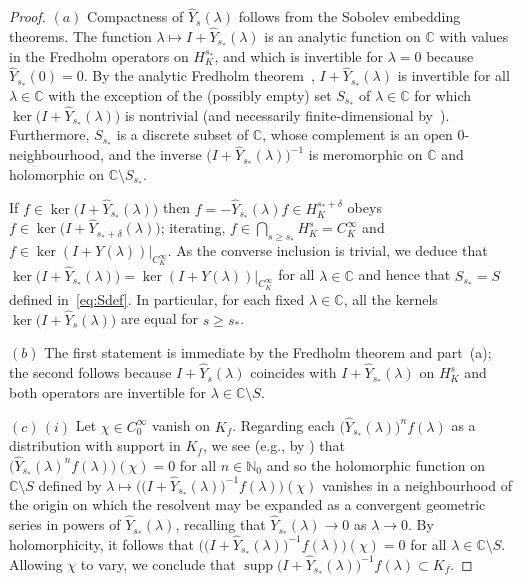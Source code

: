\documentclass[pdftex]{sigma}
\numberwithin{equation}{section}
\newcommand{\CC}{{\mathbb C}}
\newcommand{\NN}{{\mathbb N}}
\DeclareMathOperator{\supp}{supp}
\begin{document}
 \begin{proof}
 	$(a)$ Compactness of $\hat{Y}_s(\lambda)$ follows from the Sobolev embedding theorems.
 	The function $\lambda\mapsto I+ \hat{Y}_{s_*}(\lambda)$ is an analytic function on $\CC$ with values in the Fredholm operators on $H^{s_*}_K$, and which is invertible for $\lambda=0$ because $\hat{Y}_{s_*}(0)=0$. By the analytic Fredholm theorem~\cite[Theorem VI.14]{ReedSimon:vol1}, $I+ \hat{Y}_{s_*}(\lambda)$ is invertible for all $\lambda\in\CC$ with the exception of the (possibly empty) set $S_{s_*}$ of $\lambda\in \CC$ for which $\ker \big(I+ \hat{Y}_{s_*}(\lambda)\big)$ is nontrivial (and necessarily finite-dimensional by~\cite[Theorem VI.15]{ReedSimon:vol1}). Furthermore, $S_{s_*}$ is a
 	discrete subset of $\CC$, whose complement is an open $0$-neighbourhood, and the inverse $\big(I+ \hat{Y}_{s_*}(\lambda)\big)^{-1}$ is meromorphic on $\CC$ and holomorphic on $\CC\setminus S_{s_*}$.
 	
 	If $f\in\ker \big(I+\hat{Y}_{s_*}(\lambda)\big)$ then $f = - \hat{Y}_{s_*}(\lambda)f\in H^{s_*+\delta}_K$ obeys $f\in\ker \big(I+ \hat{Y}_{s_*+\delta}(\lambda)\big)$; iterating, $f\in \bigcap_{s\ge s_*} H^s_K=C^\infty_K$ and $f\in \ker (I+ Y(\lambda))|_{C^\infty_K}$.
 	As the converse inclusion is trivial, we deduce that
 	$\ker \big(I+\hat{Y}_{s_*}(\lambda)\big)= \ker (I+ Y(\lambda))|_{C^\infty_K}$
 	for all $\lambda\in \CC$ and hence that $S_{s_*}=S$ defined in~\eqref{eq:Sdef}. In particular, for each fixed $\lambda\in\CC$, all the kernels $\ker \big(I+\hat{Y}_{s}(\lambda)\big)$ are equal for $s\ge s_*$.
 	
 	$(b)$ The first statement is immediate by the Fredholm theorem and part~(a); the second follows because $I+\hat{Y}_{s}(\lambda)$ coincides with $I+ \hat{Y}_{s_*}(\lambda)$ on $H^s_K$ and both operators are invertible for $\lambda\in\CC\setminus S$.
 	
 	$(c)$\,$(i)$ Let $\chi\in C_0^\infty$ vanish on $K_f$. Regarding each $\big(\hat{Y}_{s_*}(\lambda)\big)^{n}f(\lambda)$ as a distribution with support in $K_f$, we see (e.g., by \cite[Theorem 2.3.3]{Hormander1}) that
 	$\big(\hat{Y}_{s_*}(\lambda)^{n}f(\lambda)\big)(\chi)=0$ for all $n\in \NN_0$ and so the
 	holomorphic function on $\CC\setminus S$ defined by $\lambda\mapsto \big(\big(I+\hat{Y}_{s_*}(\lambda)\big)^{-1}f(\lambda)\big)(\chi)$ vanishes in a neighbourhood of the origin on which the resolvent may be expanded as a convergent geometric series in powers of $\hat{Y}_{s_*}(\lambda)$, recalling that $\hat{Y}_{s_*}(\lambda)\to 0$ as $\lambda\to 0$.
 	By holomorphicity, it follows that
 	$\big(\big(I+\hat{Y}_{s_*}(\lambda)\big)^{-1}f(\lambda)\big)(\chi)=0$ for all $\lambda\in\CC\setminus S$.
 	Allowing $\chi$ to vary, we conclude that $\supp \big(I+\hat{Y}_{s_*}(\lambda)\big)^{-1}f(\lambda)\subset K_f$.
 	

\end{proof}
\end{document}
